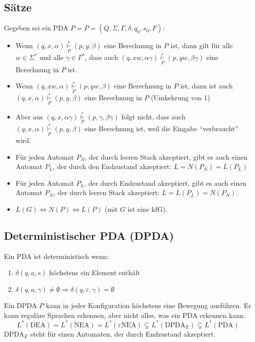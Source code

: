 \subsection{Sätze}
Gegeben sei ein PDA $P = P = (Q, \Sigma, \Gamma, \delta, q_0, s_0, F)$:
\begin{itemize}\itemsep0em
	\item Wenn $(q, x, \alpha) \overset{\centerdot}{\underset{P}{\vdash}} (p, y, \beta)$ eine Berechnung in $P$ ist, dann gilt für alle $w \in \Sigma^*$ und alle $\gamma \in \Gamma^*$, dass auch $(q, xw, \alpha\gamma) \overset{\centerdot}{\underset{P}{\vdash}} (p, yw, \beta\gamma)$ eine Berechnung in $P$ ist.

	\item Wenn $(q, xw, \alpha) \overset{\centerdot}{\underset{P}{\vdash}} (p, yw, \beta)$ eine Berechnung in $P$ ist, dann ist auch $(q, x, \alpha) \overset{\centerdot}{\underset{P}{\vdash}} (p, y, \beta)$ eine Berechnung in $P$ (Umkehrung von 1)

	\item Aber aus $(q, x, \alpha\gamma) \overset{\centerdot}{\underset{P}{\vdash}} (p, \gamma, \beta\gamma)$ folgt nicht, dass auch $(q, x, \alpha) \overset{\centerdot}{\underset{P}{\vdash}} (p, y, \beta)$ eine Berechnung ist, weil die Eingabe \enquote{verbraucht} wird.

	\item Für jeden Automat $P_N$, der durch leeren Stack akzeptiert, gibt es auch einen Automat $P_L$, der durch den Endzustand akzeptiert: $L = N(P_N) = L(P_L)$
		
	\item Für jeden Automat $P_L$, der durch Endzustand akzeptiert, gibt es auch einen Automat $P_N$, der durch leeren Stack akzeptiert: $L = L(P_L) = N(P_N)$. 

	\item $L(G) \Leftrightarrow N(P) \Leftrightarrow L(P)$ (mit $G$ ist eine kfG).
\end{itemize}

\subsection{Deterministischer PDA (DPDA)}
Ein PDA ist deterministisch wenn:
\begin{enumerate}\itemsep0em
	\item $\delta(q, a, s)$ höchstens ein Element enthält
	\item $\delta(q, a, \gamma) \neq \emptyset \Rightarrow \delta(q, \varepsilon, \gamma) = \emptyset$
\end{enumerate}
Ein DPDA $P$ kann in jeder Konfiguration höchstens eine Bewegung ausführen. Er kann reguläre Sprachen erkennen, aber nicht alles, was ein PDA erkennen kann. %
\begin{equation*}
	L^*(\mbox{DEA}) = L^*(\mbox{NEA}) = L^*(\varepsilon\mbox{NEA}) \subsetneq L^*(\mbox{DPDA}_E) \subsetneq L^*(\mbox{PDA})
\end{equation*}
DPDA$_E$ steht für einen Automaten, der durch Endzustand akzeptiert.
	
